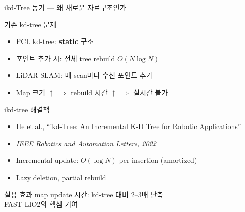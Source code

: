\begin{frame}{ikd-Tree 동기 — 왜 새로운 자료구조인가}
  \begin{block}{기존 kd-tree 문제}
    \begin{itemize}
      \item PCL kd-tree: \textbf{static} 구조
      \item 포인트 추가 시: 전체 tree rebuild $O(N\log N)$
      \item LiDAR SLAM: 매 scan마다 수천 포인트 추가
      \item Map 크기 $\uparrow$ $\Rightarrow$ rebuild 시간 $\uparrow$ $\Rightarrow$ 실시간 불가
    \end{itemize}
  \end{block}
  \pause
  \begin{block}{ikd-tree 해결책}
    \begin{itemize}
      \item He et al., ``ikd-Tree: An Incremental K-D Tree for Robotic Applications''
      \item \textit{IEEE Robotics and Automation Letters, 2022}
      \item Incremental update: $O(\log N)$ per insertion (amortized)
      \item Lazy deletion, partial rebuild
    \end{itemize}
  \end{block}
  \pause
  \begin{exampleblock}{실용 효과}
    map update 시간: kd-tree 대비 2--3배 단축\\
    FAST-LIO2의 핵심 기여
  \end{exampleblock}
\end{frame}

